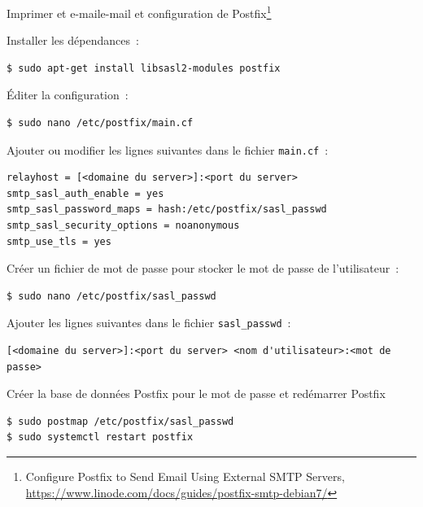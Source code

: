\documentclass{beamer}
\begin{document}
    \begin{frame}[fragile]{Imprimer et e-mail}{e-mail et configuration de Postfix\footnote{Configure Postfix to Send Email Using External SMTP Servers, \url{https://www.linode.com/docs/guides/postfix-smtp-debian7/}}}
        \begin{tiny}
            Installer les dépendances~:
            \begin{lstlisting}[language=bash,basicstyle=\tiny\ttfamily]
$ sudo apt-get install libsasl2-modules postfix
            \end{lstlisting}
            Éditer la configuration~:
            \begin{lstlisting}[language=bash,basicstyle=\tiny\ttfamily]
$ sudo nano /etc/postfix/main.cf
            \end{lstlisting}
            Ajouter ou modifier les lignes suivantes dans le fichier \lstinline{main.cf}~:
            \begin{lstlisting}[basicstyle=\tiny\ttfamily]
relayhost = [<domaine du server>]:<port du server>
smtp_sasl_auth_enable = yes
smtp_sasl_password_maps = hash:/etc/postfix/sasl_passwd
smtp_sasl_security_options = noanonymous
smtp_use_tls = yes
            \end{lstlisting}
            Créer un fichier de mot de passe pour stocker le mot de passe de l'utilisateur~:
            \begin{lstlisting}[language=bash,basicstyle=\tiny\ttfamily]
$ sudo nano /etc/postfix/sasl_passwd
            \end{lstlisting}
            Ajouter les lignes suivantes dans le fichier \lstinline{sasl_passwd}~:
            \begin{lstlisting}[basicstyle=\tiny\ttfamily]
[<domaine du server>]:<port du server> <nom d'utilisateur>:<mot de passe>
            \end{lstlisting}
            Créer la base de données Postfix pour le mot de passe et redémarrer Postfix
            \begin{lstlisting}[language=bash,basicstyle=\tiny\ttfamily]
$ sudo postmap /etc/postfix/sasl_passwd
$ sudo systemctl restart postfix
            \end{lstlisting}
        \end{tiny}
    \end{frame}
\end{document}
